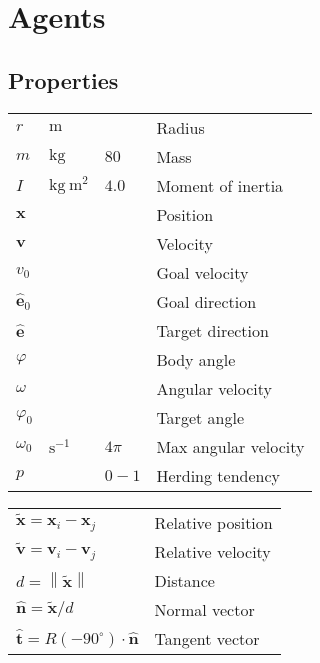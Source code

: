 \section{Agents}
\subsection{Properties}

\begin{tabular*}{1.0\linewidth}{llll}
\hline
\hline
$ r $                    & $ \mathrm{m} $ &  & Radius \\
$ m $                    & $ \mathrm{kg} $ & $ 80 $ & Mass \\
$ I $                    & $ \mathrm{kg \ m^{2}} $ & $ 4.0 $ & Moment of inertia \\
\hline
\hline
$ \mathbf{x} $           &  &  & Position \\
$ \mathbf{v} $           &  &  & Velocity \\
$ v_{0} $                &  &  & Goal velocity \\  
$ \hat{\mathbf{e}}_{0} $ &  &  & Goal direction \\
$ \hat{\mathbf{e}} $     &  &  & Target direction \\
\hline
\hline
$ \varphi $              &  &  & Body angle \\
$ \omega $               &  &  & Angular velocity \\
$ \varphi_{0} $          &  &  & Target angle \\
$ \omega_{0} $           & $ \mathrm{s^{-1}} $ & $ 4\pi $ & Max angular velocity \\
\hline
\hline
$ p $                    &  & $ 0 - 1 $ & Herding tendency \\
\hline
\hline
\end{tabular*}


\begin{tabular*}{1.0\linewidth}{ll}
\hline
\hline
$ \tilde{\mathbf{x}} = \mathbf{x}_{i} - \mathbf{x}_{j} $ & Relative position \\
$ \tilde{\mathbf{v}} = \mathbf{v}_{i} - \mathbf{v}_{j} $ & Relative velocity \\
$ d = \left\|\tilde{\mathbf{x}}\right\| $ & Distance\\
$ \hat{\mathbf{n}} = \tilde{\mathbf{x}} / d $ & Normal vector \\
$ \hat{\mathbf{t}} = R(-90^{\circ}) \cdot \hat{\mathbf{n}} $ & Tangent vector \\
\hline
\hline
\end{tabular*}


